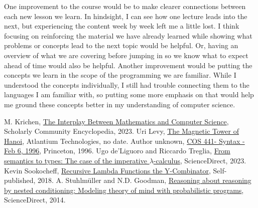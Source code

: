 \documentclass{article}
\theoremstyle{theorem}
\theoremstyle{definition}
\theoremstyle{remark}
\begin{document}
\hspace{0.65cm}One improvement to the course would be to make clearer connections between each new lesson we learn. In hindsight, I can see how one lecture leads into the next, but experiencing the content week by week left me a little lost. I think
focusing on reinforcing the material we have already learned while showing what problems or concepts lead to the next topic would be helpful. Or, having an overview of what we are covering before jumping in so we know what to expect ahead of time would also be helpful.
Another improvement would be putting the concepts we learn in the scope of the programming we are familiar. While I understood the concepts individually, I still had trouble connecting them to the languages I am familiar with, so putting some more emphasis on that would help me ground these concepts better
in my understanding of computer science. 
  
\begin{thebibliography}{99}

\label{1} M. Krichen, \href{https://encyclopedia.pub/entry/44440}{The Interplay Between Mathematics and Computer Science}, Scholarly Community Encyclopedia, 2023.
\label{2} Uri Levy, \href{https://arxiv.org/pdf/1003.0225}{The Magnetic Tower of Hanoi}, Atlantium Technologies, no date.
\label{3} Author unknown, \href{https://www.cs.princeton.edu/courses/archive/spr96/cs441/notes/l1.html}{COS 441- Syntax - Feb 6, 1996}, Princeton, 1996.
\label{4} Ugo de'Liguoro and Riccardo Treglia, \href{https://www.sciencedirect.com/science/article/pii/S030439752300395X}{From semantics to types: The case of the imperative $\lambda$-calculus}, ScienceDirect, 2023.
\label{5} Kevin Sookocheff, \href{https://sookocheff.com/post/fp/recursive-lambda-functions/}{Recursive Lambda Functions the Y-Combinator}, Self-published, 2018.
\label{6} A. Stuhlmüller and N.D. Goodman, \href{https://www.sciencedirect.com/science/article/pii/S1389041713000387?via%3Dihub}{Reasoning about reasoning by nested conditioning: Modeling theory of mind with probabilistic programs}, ScienceDirect, 2014.
\end{thebibliography}
\end{document}
